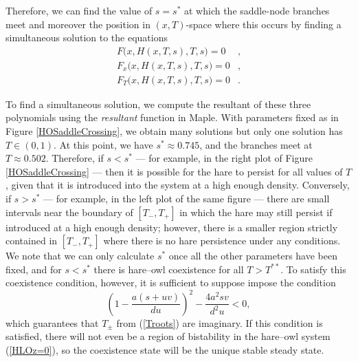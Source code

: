\documentclass[12pt]{UOthesis}
\theoremstyle{remarkstyle}
\begin{document}
Therefore, we can find the value of $s=s^*$ at which the saddle-node branches meet and moreover the position in $(x,T)$-space where this occurs by finding a simultaneous solution to the equations
\begin{equation}
	\begin{split}
		F\Big(x,H(x,T,s),T,s\Big)=0&,\\
		F_x\Big(x,H(x,T,s),T,s\Big)=0&,\\
		F_T\Big(x,H(x,T,s),T,s\Big)=0&.
	\end{split}
	\label{HOSaddleCrossingPoint}
\end{equation}

To find a simultaneous solution, we compute the resultant of these three polynomials using the \textit{resultant} function in Maple. With parameters fixed as in Figure \ref{HOSaddleCrossing}, we obtain many solutions but only one solution has $T\in(0,1)$. At this point, we have $s^*\approx 0.745$, and the branches meet at $T\approx 0.502$. Therefore, if $s<s^*$ --- for example, in the right plot of Figure \ref{HOSaddleCrossing} --- then it is possible for the hare to persist for all values of $T$, given that it is introduced into the system at a high enough density. Conversely, if $s>s^*$ --- for example, in the left plot of the same figure --- there are small intervals near the boundary of $[T_-,T_+]$ in which the hare may still persist if introduced at a high enough density; however, there is a smaller region strictly contained in $[T_-,T_+]$ where there is no hare persistence under any conditions. We note that we can only calculate $s^*$ once all the other parameters have been fixed, and for $s<s^*$ there is hare--owl coexistence for all $T>T^{**}$. To satisfy this coexistence condition, however, it is sufficient to suppose impose the condition
\begin{equation}
	\left(1-\frac{a(s+uv)}{du}\right)^2-\frac{4a^2sv}{d^2u}<0,
	\label{HLOTpmImagCond}
\end{equation}
which guarantees that $T_{\pm}$ from (\ref{Troots}) are imaginary. If this condition is satisfied, there will not even be a region of bistability in the hare--owl system (\ref{HLOz=0}), so the coexistence state will be the unique stable steady state.\\
\end{document}
